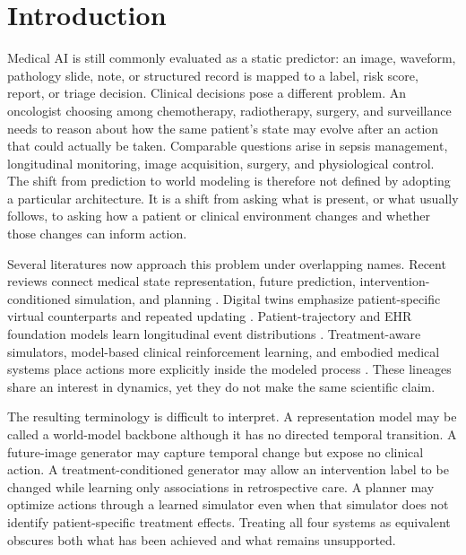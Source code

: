 \section{Introduction}
\label{sec:introduction}

Medical AI is still commonly evaluated as a static predictor: an image, waveform, pathology slide, note, or structured record is mapped to a label, risk score, report, or triage decision. Clinical decisions pose a different problem. An oncologist choosing among chemotherapy, radiotherapy, surgery, and surveillance needs to reason about how the same patient's state may evolve after an action that could actually be taken. Comparable questions arise in sepsis management, longitudinal monitoring, image acquisition, surgery, and physiological control. The shift from prediction to world modeling is therefore not defined by adopting a particular architecture. It is a shift from asking what is present, or what usually follows, to asking how a patient or clinical environment changes and whether those changes can inform action.

Several literatures now approach this problem under overlapping names. Recent reviews connect medical state representation, future prediction, intervention-conditioned simulation, and planning \citep{Qazi2025BeyondGenerativeAI,Saeed2026MedicalWorldModel,Liu2026MedicalWorldModelsReview,Wang2026TowardsBiomedicalWorldModels}. Digital twins emphasize patient-specific virtual counterparts and repeated updating \citep{Iqbal2025consensusstatementon,Katsoulakis2024Digitaltwinshealth,Ghatti2023DigitalTwinsHealthcare}. Patient-trajectory and EHR foundation models learn longitudinal event distributions \citep{Kraljevi_2024Foresightgenerativepretrained,Waxler2025GenerativeMedicalEvent,Guo2026Systematicreviewfoundation}. Treatment-aware simulators, model-based clinical reinforcement learning, and embodied medical systems place actions more explicitly inside the modeled process \citep{Yang2025MedicalWorldModel,Ding2025CLARITYMedicalWorld,Raghu2018ModelBasedReinforcement,Chen2026ECGWMPhysiology,Sivakumar2026SWoMoNeuroSymbolic}. These lineages share an interest in dynamics, yet they do not make the same scientific claim.

The resulting terminology is difficult to interpret. A representation model may be called a world-model backbone although it has no directed temporal transition. A future-image generator may capture temporal change but expose no clinical action. A treatment-conditioned generator may allow an intervention label to be changed while learning only associations in retrospective care. A planner may optimize actions through a learned simulator even when that simulator does not identify patient-specific treatment effects. Treating all four systems as equivalent obscures both what has been achieved and what remains unsupported.

